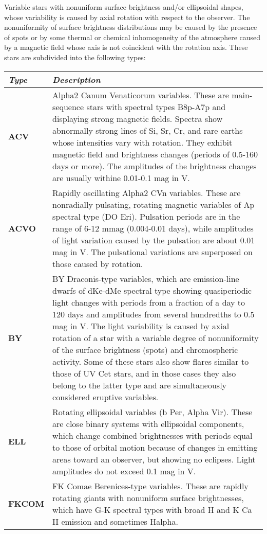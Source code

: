 Variable stars with nonuniform surface brightness and/or ellipsoidal
shapes, whose variability is caused by axial rotation with respect to
the observer. The nonuniformity of surface brightness distributions may
be caused by the presence of spots or by some thermal or chemical
inhomogeneity of the atmosphere caused by a magnetic field whose axis is
not coincident with the rotation axis. These stars are subdivided into
the following types:

\begin{longtabu} to \textwidth {l|X}
\toprule
\emph{Type} & \emph{Description}\tabularnewline
\midrule
\textbf{ACV} & Alpha2 Canum Venaticorum variables. These are
main-sequence stars with spectral types B8p-A7p and displaying strong
magnetic fields. Spectra show abnormally strong lines of Si, Sr, Cr, and
rare earths whose intensities vary with rotation. They exhibit magnetic
field and brightness changes (periods of 0.5-160 days or more). The
amplitudes of the brightness changes are usually withine 0.01-0.1 mag in
V.\tabularnewline
\midrule
\textbf{ACVO} & Rapidly oscillating Alpha2 CVn variables. These are
nonradially pulsating, rotating magnetic variables of Ap spectral type
(DO Eri). Pulsation periods are in the range of 6-12 mmag (0.004-0.01
days), while amplitudes of light variation caused by the pulsation are
about 0.01 mag in V. The pulsational variations are superposed on those
caused by rotation.\tabularnewline
\midrule
\textbf{BY} & BY Draconis-type variables, which are emission-line dwarfs
of dKe-dMe spectral type showing quasiperiodic light changes with
periods from a fraction of a day to 120 days and amplitudes from several
hundredths to 0.5 mag in V. The light variability is caused by axial
rotation of a star with a variable degree of nonuniformity of the
surface brightness (spots) and chromospheric activity. Some of these
stars also show flares similar to those of UV Cet stars, and in those
cases they also belong to the latter type and are simultaneously
considered eruptive variables.\tabularnewline
\midrule
\textbf{ELL} & Rotating ellipsoidal variables (b Per, Alpha Vir). These
are close binary systems with ellipsoidal components, which change
combined brightnesses with periods equal to those of orbital motion
because of changes in emitting areas toward an observer, but showing no
eclipses. Light amplitudes do not exceed 0.1 mag in V.\tabularnewline
\midrule
\textbf{FKCOM} & FK Comae Berenices-type variables. These are rapidly
rotating giants with nonuniform surface brightnesses, which have G-K
spectral types with broad H and K Ca II emission and sometimes Halpha.

\end{longtabu}
